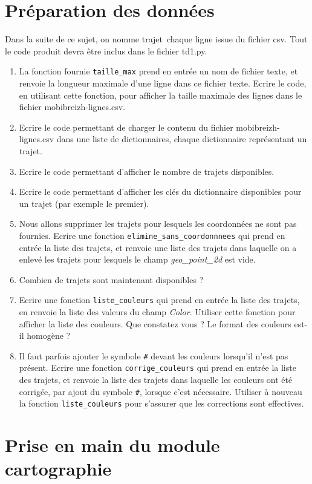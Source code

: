 \documentclass[11pt,a4paper]{article}
\begin{document}
\section{Préparation des données}
Dans la suite de ce sujet, on nomme \og trajet\fg ~chaque ligne issue du fichier csv.
Tout le code produit devra être inclus dans le fichier td1.py.
\begin{enumerate}
\item La fonction fournie \verb+taille_max+ prend en entrée un nom de fichier texte, et renvoie la longueur maximale d'une ligne dans ce fichier texte. Ecrire le code, en utilisant cette fonction, pour afficher la taille maximale des lignes dans le fichier mobibreizh-lignes.csv.

\item Ecrire le code permettant de charger le contenu du fichier mobibreizh-lignes.csv dans une liste de dictionnaires, chaque dictionnaire représentant un trajet.
\item Ecrire le code permettant d'afficher le nombre de trajets disponibles.
\item Ecrire le code permettant d'afficher les clés du dictionnaire disponibles pour un trajet (par exemple le premier).
\item Nous allons supprimer les trajets pour lesquels les coordonnées ne sont pas fournies. Ecrire une fonction \verb+elimine_sans_coordonnnees+ qui prend en entrée la liste des trajets, et renvoie une liste des trajets dans laquelle on a enlevé les trajets pour lesquels le champ \emph{geo\_point\_2d} est vide.
\item Combien de trajets sont maintenant disponibles ? 
\item Ecrire une fonction \verb+liste_couleurs+ qui prend en entrée la liste des trajets, en renvoie la liste des valeurs du champ \emph{Color}. Utiliser cette fonction pour afficher la liste des couleurs. Que constatez vous ? Le format des couleurs est-il homogène ? 
\item Il faut parfois ajouter le symbole \verb+#+ devant les couleurs lorsqu'il n'est pas présent. Ecrire une fonction  \verb+corrige_couleurs+ qui prend en entrée la liste des trajets, et renvoie la liste 
des trajets dans laquelle les couleurs ont été corrigée, par ajout du symbole \verb+#+, lorsque c'est nécessaire. Utiliser à nouveau la fonction  \verb+liste_couleurs+ pour s'assurer que les corrections sont effectives.
\end{enumerate}


\section{Prise en main du module cartographie}
\end{document}
